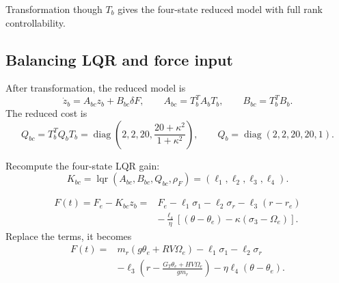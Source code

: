 Transformation though $T_b$ gives the four-state reduced model with full rank controllability.

\subsection{Balancing LQR and force input}

After transformation, the reduced model is
\begin{equation}
\dot z_b=A_{bc}z_b+B_{bc}\delta F,\qquad
A_{bc}=T_b^TA_bT_b,\qquad B_{bc}=T_b^TB_b.
\end{equation}
The reduced cost is
\begin{equation}
Q_{bc}=T_b^TQ_bT_b=\operatorname{diag}\left(2,2,20,\frac{20+\kappa^2}{1+\kappa^2}\right),\qquad
Q_b=\operatorname{diag}(2,2,20,20,1).
\end{equation}

Recompute the four-state LQR gain:
\begin{equation}
K_{bc}=\operatorname{lqr}(A_{bc},B_{bc},Q_{bc},\rho_F)
=(\ell_1,\ell_2,\ell_3,\ell_4).
\end{equation}

\begin{equation}
\begin{aligned}
F(t)=F_e-K_{bc}z_b
={}&F_e-\ell_1\sigma_1-\ell_2\sigma_r-\ell_3(r-r_e)\\
&-\frac{\ell_4}{\eta}
[(\theta-\theta_e)-\kappa(\sigma_3-\Omega_e)].
\end{aligned}
\end{equation}
Replace the terms, it becomes
\begin{equation}
\begin{aligned}
F(t)={}&m_r(g\theta_e+RV\Omega_e)
-\ell_1\sigma_1-\ell_2\sigma_r\\
&-\ell_3\left(r-\frac{G_T\theta_e+HV\Omega_e}{gm_r}\right)
-\eta\ell_4(\theta-\theta_e).
\end{aligned}
\end{equation}

